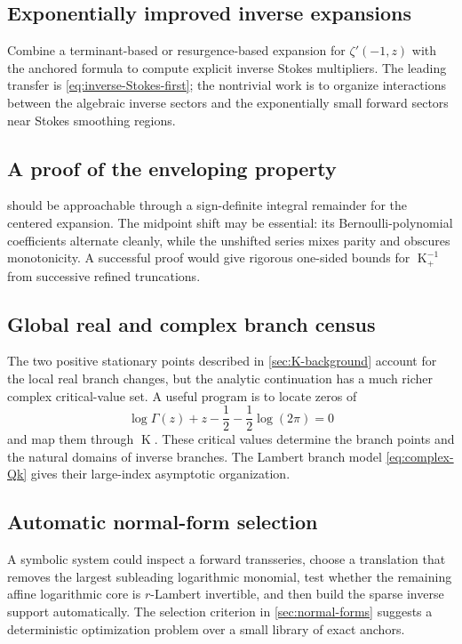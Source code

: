 \documentclass[11pt,oneside]{article}
\theoremstyle{plain}
\theoremstyle{definition}
\theoremstyle{remark}
\newcommand{\Kfun}{\operatorname{K}}
\begin{document}
\subsection{Exponentially improved inverse expansions}

Combine a terminant-based or resurgence-based expansion for
\(\zeta'(-1,z)\) with the anchored formula to compute explicit inverse Stokes
multipliers.  The leading transfer is \eqref{eq:inverse-Stokes-first}; the
nontrivial work is to organize interactions between the algebraic inverse
sectors and the exponentially small forward sectors near Stokes smoothing
regions.

\subsection{A proof of the enveloping property}

 should be approachable through a sign-definite integral
remainder for the centered expansion.  The midpoint shift may be essential:
its Bernoulli-polynomial coefficients alternate cleanly, while the unshifted
series mixes parity and obscures monotonicity.  A successful proof would give
rigorous one-sided bounds for \(\Kfun_+^{-1}\) from successive refined
truncations.

\subsection{Global real and complex branch census}

The two positive stationary points described in
\cref{sec:K-background} account for the local real branch changes, but the
analytic continuation has a much richer complex critical-value set.  A useful
program is to locate zeros of
\begin{equation}
 \log\Gamma(z)+z-\frac12-\frac12\log(2\pi)=0
 \label{eq:complex-critical-equation}
\end{equation}
and map them through \(\Kfun\).  These critical values determine the branch
points and the natural domains of inverse branches.  The Lambert branch model
\eqref{eq:complex-Qk} gives their large-index asymptotic organization.

\subsection{Automatic normal-form selection}

A symbolic system could inspect a forward transseries, choose a translation
that removes the largest subleading logarithmic monomial, test whether the
remaining affine logarithmic core is \(r\)-Lambert invertible, and then build
the sparse inverse support automatically.  The selection criterion in
\cref{sec:normal-forms} suggests a deterministic optimization problem over a
small library of exact anchors.
\end{document}
